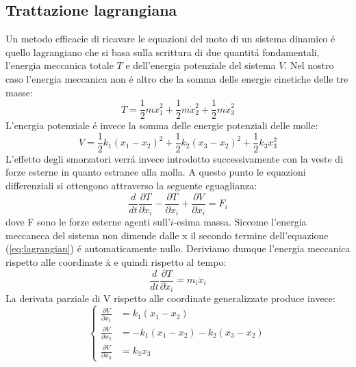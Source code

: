 \documentclass[12pt,a4paper]{article}
\begin{document}
 	\subsection[Lagrangiana]{Trattazione lagrangiana}
 		Un metodo efficacie di ricavare le equazioni del moto di un sistema dinamico \'e quello lagrangiano che si basa sulla scrittura di due quantit\'a fondamentali, l'energia meccanica totale $T$ e dell'energia potenziale del sistema $V$. Nel nostro caso l'energia meccanica non \'e altro che la somma delle energie cinetiche delle tre masse:
 		\begin{equation}
 			T= \frac{1}{2} m \dot x_1^2 +\frac{1}{2} m \dot x_2^2+ \frac{1}{2}m \dot x_3^2 
 			\label{eq:mechanical-energy}
 		\end{equation}
 		L'energia potenziale \'e invece la somma delle energie potenziali delle molle:
 		\begin{equation}
 			V= \frac{1}{2} k_1(x_1-x_2)^2+\frac{1}{2} k_2(x_3-x_2)^2 + \frac{1}{2} k_3 x_3^2
 			\label{eq:potential-energy}
 		\end{equation}
 		L'effetto degli smorzatori verr\'a invece introdotto successivamente con la veste di forze esterne in quanto estranee alla molla.
 		A questo punto le equazioni differenziali si ottengono attraverso la seguente eguaglianza: 		
 		\begin{equation}
 			\frac{d}{dt} \frac{\partial T}{\partial \dot x_i} - \frac{\partial T}{\partial x_i} + \frac{\partial V}{\partial x_i}=F_i
 			\label{eq:lagrangian}
 		\end{equation}
 		dove F sono le forze esterne agenti sull'$i$-esima massa. Siccome l'energia meccaneca del sistema non dimende dalle x il secondo termine dell'equazione (\ref{eq:lagrangian}) \'e automaticamente nullo. Deriviamo dumque l'energia meccanica rispetto alle coordinate \.x e quindi rispetto al tempo:
 		\begin{equation}
 			\frac{d}{dt} \frac{\partial T}{\partial \dot x_i}= m_i \ddot{x}_i
 			\label{eq:lagrangian-1}
 		\end{equation}
 		La derivata parziale di V rispetto alle coordinate generalizzate produce invece:
 		\[
 		\begin{cases}
 		\frac{\partial V}{\partial x_1}& = k_1(x_1 - x_2)
 		\\
 		\frac{\partial V}{\partial x_2}& = - k_1(x_1 - x_2) - k_2(x_3 - x_2)
 		\\
 		\frac{\partial V}{\partial x_3}& = k_3 x_3
 		\end{cases}
 		\]
\end{document}
